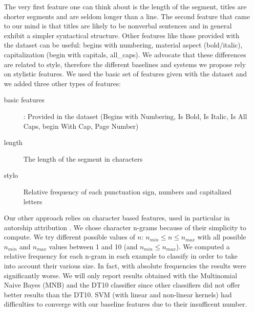 
 
 The very first feature one can think about is the length of the segment, titles are shorter segments and are seldom longer than a line. %
 The second feature that came to our mind is that titles are likely to be nonverbal sentences and in general exhibit a simpler syntactical structure.
Other features like those provided with the dataset can be useful: begins with numbering, material aspect (bold/italic), capitalization (begin with capitals, all\_caps). 
 We advocate that these differences are related to style, therefore the different baselines and systems we propose rely on stylistic features. 
 We used the basic set of features given with the dataset and we added three other types of features:
  
  \begin{description}
\item[basic features]: Provided in the dataset (Begins with Numbering, Is Bold, Is Italic, Is All Caps, begin With Cap, Page Number)
\item[length] The length of the segment in characters
\item[stylo] Relative frequency of each punctuation sign, numbers and capitalized letters
  \end{description}
  
   Our other approach relies on character based features, used in particular in autorship attribution \cite{Brixtel-2015}. We chose character n-grams because of their simplicity to compute. We try different possible values of $n$: $n_{min} \leq n \leq n_{max}$ with all possible $n_{min}$ and $n_{max}$ values between 1 and 10 (and $n_{min}\leq n_{max}$).
   We computed a relative frequency for each n-gram in each example to classify in order to take into account their various size. In fact, with absolute frequencies the results were significantly worse.  
We will only report results obtained with the Multinomial Naive Bayes (MNB) and the DT10 classifier since other classifiers did not offer better results than the DT10. SVM (with linear and non-linear kernels) had difficulties to converge with our baseline features due to their insufficent number.
  
